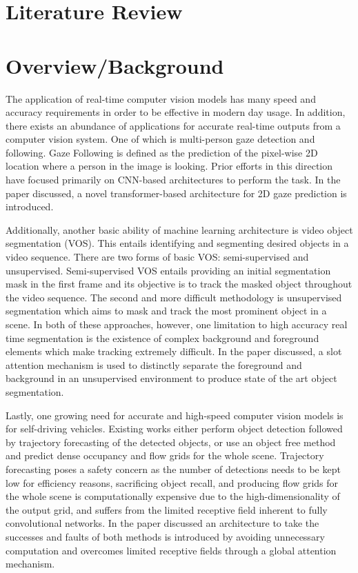\documentclass{article}
\theoremstyle{plain}
\theoremstyle{definition}
\theoremstyle{remark}
\begin{document}
\section*{\centering Literature Review}
\section*{Overview/Background}
\label{submission}

\hspace{20pt} The application of real-time computer vision models has many speed and accuracy requirements in order to be effective in modern day usage. In addition, there exists an abundance of applications for accurate real-time outputs from a computer vision system. One of which is multi-person gaze detection and following. Gaze Following is defined as the prediction of the pixel-wise 2D location where a person in the image is looking. Prior efforts in this direction have focused primarily on CNN-based architectures to perform the task. In the paper discussed, a novel transformer-based architecture for 2D gaze prediction is introduced. 

\hspace{20pt} Additionally, another basic ability of machine learning architecture is video object segmentation (VOS). This entails identifying and segmenting desired objects in a video sequence. There are two forms of basic VOS: semi-supervised and unsupervised. Semi-supervised VOS entails providing an initial segmentation mask in the first frame and its objective is to track the masked object throughout the video sequence. The second and more difficult methodology is unsupervised segmentation which aims to mask and track the most prominent object in a scene. In both of these approaches, however, one limitation to high accuracy real time segmentation is the existence of complex background and foreground elements which make tracking extremely difficult. In the paper discussed, a slot attention mechanism is used to distinctly separate the foreground and background in an unsupervised environment to produce state of the art object segmentation. 

\hspace{20pt} Lastly, one growing need for accurate and high-speed computer vision models is for self-driving vehicles. Existing works either perform object detection followed by trajectory forecasting of the detected objects, or use an object free method and predict dense occupancy and flow grids for the whole scene. Trajectory forecasting poses a safety concern as the number of detections needs to be kept low for efficiency reasons, sacrificing object recall, and producing flow grids for the whole scene is computationally expensive due to the high-dimensionality of the output grid, and suffers from the limited receptive field inherent to fully convolutional networks. In the paper discussed an architecture to take the successes and faults of both methods is introduced by avoiding unnecessary computation and overcomes limited receptive fields through a global attention mechanism.
\end{document}
